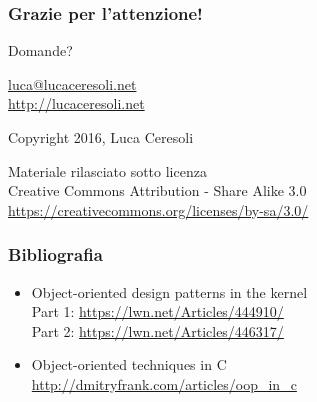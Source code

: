 \documentclass[xetex,table]{beamer}
\begin{document}
\begin{frame}
  \frametitle{Grazie per l'attenzione!}

  \begin{center}
    {\Huge Domande?}

    \vspace{0.1\textheight}

    \href{mailto:luca@lucaceresoli.net}{luca@lucaceresoli.net}\\
    \url{http://lucaceresoli.net}

    \textcopyright{} Copyright 2016, Luca Ceresoli\\

    \vspace{0.2\textheight}

    \tiny
    Materiale rilasciato sotto licenza\\
    Creative Commons Attribution - Share Alike 3.0 \\
    \url{https://creativecommons.org/licenses/by-sa/3.0/} \\
\end{center}
\end{frame}

\begin{frame}
  \frametitle{Bibliografia}
  \begin{itemize}
  \item Object-oriented design patterns in the kernel\\
    Part 1: \url{https://lwn.net/Articles/444910/}\\
    Part 2: \url{https://lwn.net/Articles/446317/}
  \item Object-oriented techniques in C\\
    \url{http://dmitryfrank.com/articles/oop_in_c}
  \end{itemize}
\end{frame}
\end{document}
